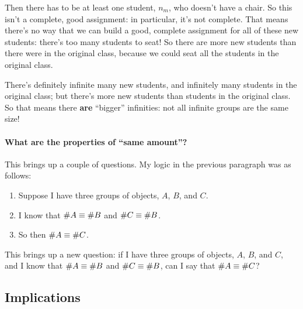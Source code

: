 Then there has to be at least one student, $n_m$, who doesn't have a chair.
So this isn't a complete, good assignment: in particular, it's not complete.
That means there's no way that we can build a good, complete assignment for all of these new students: there's too many students to seat!
So there are more new students than there were in the original class, because we could seat all the students in the original class.

There's definitely infinite many new students, and infinitely many students in the original class; but there's more new students than students in the original class.
So that means there \textbf{are} ``bigger'' infinities: not all infinite groups are the same size!

\paragraph{What are the properties of ``same amount''?}
This brings up a couple of questions.
My logic in the previous paragraph was as follows:

\begin{enumerate}
    \item Suppose I have three groups of objects, $A$, $B$, and $C$.
    \item I know that $\# A \equiv \# B$ and $\# C \equiv \# B$.
    \item So then $\# A \equiv \# C$.
\end{enumerate}

This brings up a new question: if I have three groups of objects, $A$, $B$, and $C$, and I know that $\# A \equiv \# B$ and $\# C \equiv \# B$, can I say that $\# A \equiv \# C$?

\subsection{Implications}


